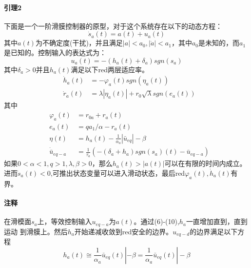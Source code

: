 \documentclass{cjc}
\begin{document}
    \paragraph{引理2}
    下面是一个一阶滑膜控制器的原型，对于这个系统存在以下的动态方程：  
    \begin{equation}
      \dot{s}_a(t) = a(t) + u_a(t)
    \end{equation}  
    其中$a(t)$为不确定度(干扰)，并且满足$|a|<a_0,|\dot{a}|<a_1$，其中$a_0$是未知的，而$a_1$
    是已知的。控制输入的表达式为：
    \begin{equation}
      u_a(t) = -(h_a(t) +\delta _a)sgn(s_a)
    \end{equation}
    其中$\delta _a> 0 $并且$h_a(t)$满足以下{{red}两层适应率}。
    \begin{eqnarray}
      &\dot{h}_a(t) &= - \varphi_a (t) sgn(\eta  _a(t))  \\
      &\dot{r}_a(t) &= \lambda  |\eta_a (t)| + r_0 \sqrt{\lambda  }sgn(e_a(t))
    \end{eqnarray}
    其中\:
    \begin{eqnarray}  
      &\varphi_a (t) &= r_{0a} + r_a(t) \\
      &e_a(t)& = q a_1/\alpha  - r_a(t) \\
      &\eta  (t) &= h_a(t) - \frac{1}{\alpha_a}|\bar{u}_{eq}| - \beta \\
      &\dot{\bar{u}}_{eq-a} &= \frac{1}{\tau _a}(-(\delta_a + h_a )sgn(s_a)(t)-\bar{u}_{eq-a})
    \end{eqnarray}
    如果$0<\alpha <1,q>1,\lambda ,\beta >0$，那么$h_a(t)>|a(t)|$可以在有限的时间内成立。
    进而$\dot{s}_a(t)<0$,可推出状态变量可以进入滑动状态，最后{{red}$\varphi_a (t),\dot{h}_a(t)$有界}。
    
    \paragraph{注释}
    在滑模面$s_a$上，等效控制输入$u_{eq-a}$为$a(t)$。通过(6)-(10),$h_a$一直增加直到，直到运动
    到滑膜上。然后$h_a$开始递减收敛到{{red}安全的边界}。$u_{eq-d}$的边界满足以下方程\:
    \begin{equation}
      h_a(t) \cong \frac{1}{\alpha _a}\bar{u}_{eq}(t)| -\beta 
      =\frac{1}{\alpha _a}\bar{u}_{eq}(t)| -\beta
    \end{equation}
    
    
    
\end{document}
